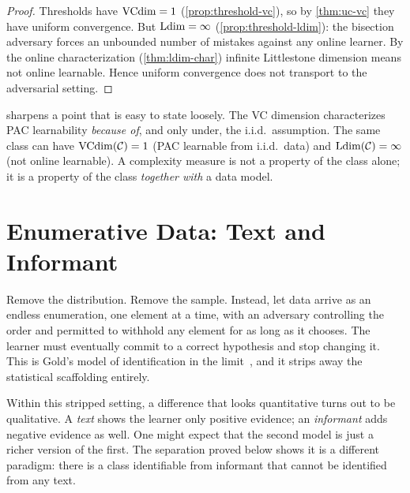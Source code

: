 \begin{proof}
Thresholds have $\mathrm{VCdim} = 1$ (\cref{prop:threshold-vc}), so by \cref{thm:uc-vc} they have uniform convergence. But $\mathrm{Ldim} = \infty$ (\cref{prop:threshold-ldim}): the bisection adversary forces an unbounded number of mistakes against any online learner. By the online characterization (\cref{thm:ldim-char}) infinite Littlestone dimension means not online learnable. Hence uniform convergence does not transport to the adversarial setting.
\end{proof}

\begin{remark}
\label{rmk:vc-jurisdiction}
 sharpens a point that is easy to state loosely. The VC dimension characterizes PAC learnability \emph{because of}, and only under, the i.i.d.\ assumption. The same class can have $\mathrm{VCdim}(\mathcal{C}) = 1$ (PAC learnable from i.i.d.\ data) and $\mathrm{Ldim}(\mathcal{C}) = \infty$ (not online learnable). A complexity measure is not a property of the class alone; it is a property of the class \emph{together with} a data model.
\end{remark}


\section{Enumerative Data: Text and Informant}
\label{sec:text-informant}

Remove the distribution. Remove the sample. Instead, let data arrive as an endless enumeration, one element at a time, with an adversary controlling the order and permitted to withhold any element for as long as it chooses. The learner must eventually commit to a correct hypothesis and stop changing it. This is Gold's model of identification in the limit~\cite{Gold1967}, and it strips away the statistical scaffolding entirely.

Within this stripped setting, a difference that looks quantitative turns out to be qualitative. A \emph{text} shows the learner only positive evidence; an \emph{informant} adds negative evidence as well. One might expect that the second model is just a richer version of the first. The separation proved below shows it is a different paradigm: there is a class identifiable from informant that cannot be identified from any text.

